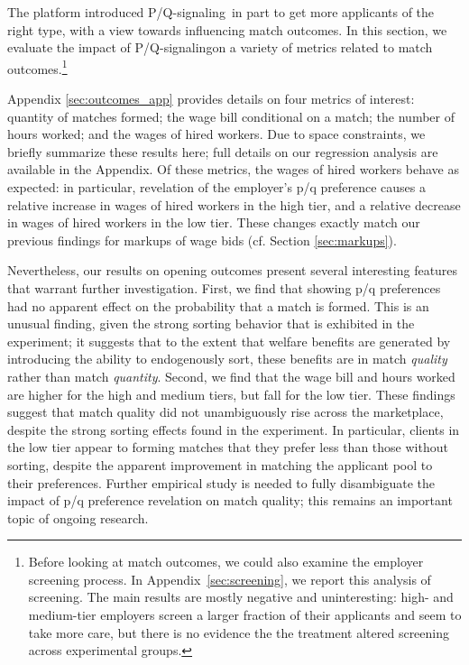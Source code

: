 \documentclass[prodmode,acmec]{ec-acmsmall}
\newcommand{\hottowel}{P/Q-signaling}
\begin{document}
The platform introduced \hottowel~in part to get more applicants of the right type, with a view towards influencing match outcomes.
In this section, we evaluate the impact of \hottowel on a variety of metrics related to match outcomes.\footnote{
Before looking at match outcomes, we could also examine the employer screening process.
In Appendix~\ref{sec:screening}, we report this analysis of screening.
The main results are mostly negative and uninteresting:
high- and medium-tier employers screen a larger fraction of their applicants and seem to take more care, but there is no evidence the the treatment altered screening across experimental groups.}  

Appendix \ref{sec:outcomes_app} provides details on four metrics of interest: quantity of matches formed; the wage bill conditional on a match; the number of hours worked; and the wages of hired workers.
Due to space constraints, we briefly summarize these results here; full details on our regression analysis are available in the Appendix.
Of these metrics, the wages of hired workers behave as expected:
in particular, revelation of the employer's p/q preference causes a relative increase in wages of hired workers in the high tier, and a relative decrease in wages of hired workers in the low tier.
These changes exactly match our previous findings for markups of wage bids (cf. Section \ref{sec:markups}).

Nevertheless, our results on opening outcomes present several interesting features that warrant further investigation.
First, we find that showing p/q preferences had no apparent effect on the probability that a match is formed.
This is an unusual finding, given the strong sorting behavior that is exhibited in the experiment; it suggests that to the extent that welfare benefits are generated by introducing the ability to endogenously sort, these benefits are in match {\em quality} rather than match {\em quantity}.
Second, we find that the wage bill and hours worked are higher for the high and medium tiers, but fall for the low tier.
These findings suggest that match quality did not unambiguously rise across the marketplace, despite the strong sorting effects found in the experiment.
In particular, clients in the low tier appear to forming matches that they prefer less than those without sorting, despite the apparent improvement in matching the applicant pool to their preferences.
Further empirical study is needed to fully disambiguate the impact of p/q preference revelation on match quality; this remains an important topic of ongoing research.
\end{document}
